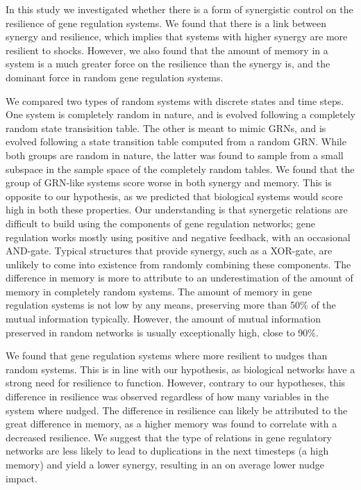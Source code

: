 \documentclass[../main.tex]{subfiles}
\begin{document}
In this study we investigated whether there is a form of synergistic control on the resilience of gene regulation systems.
We found that there is a link between synergy and resilience, which implies that systems with higher synergy are more resilient to shocks.
However, we also found that the amount of memory in a system is a much greater force on the resilience than the synergy is, and the dominant force in random gene regulation systems.

We compared two types of random systems with discrete states and time steps.
One system is completely random in nature, and is evolved following a completely random state transisition table.
The other is meant to mimic GRNs, and is evolved following a state transition table computed from a random GRN.
While both groups are random in nature, the latter was found to sample from a small subspace in the sample space of the completely random tables.
We found that the group of GRN-like systems score worse in both synergy and memory.
This is opposite to our hypothesis, as we predicted that biological systems would score high in both these properties.
Our understanding is that synergetic relations are difficult to build using the components of gene regulation networks; gene regulation works mostly using positive and negative feedback, with an occasional AND-gate.
Typical structures that provide synergy, such as a XOR-gate, are unlikely to come into existence from randomly combining these components.
The difference in memory is more to attribute to an underestimation of the amount of memory in completely random systems.
The amount of memory in gene regulation systems is not low by any means, preserving more than 50\% of the mutual information typically.
However, the amount of mutual information preserved in random networks is usually exceptionally high, close to 90\%.

We found that gene regulation systems where more resilient to nudges than random systems.
This is in line with our hypothesis, as biological networks have a strong need for resilience to function.
However, contrary to our hypotheses, this difference in resilience was observed regardless of how many variables in the system where nudged.
The difference in resilience can likely be attributed to the great difference in memory, as a higher memory was found to correlate with a decreased resilience.
We suggest that the type of relations in gene regulatory networks are less likely to lead to duplications in the next timesteps (a high memory) and yield a lower synergy, resulting in an on average lower nudge impact.
\end{document}
